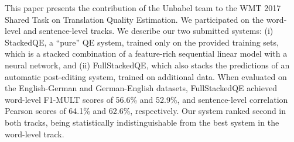 This paper presents the contribution of the Unbabel team to the WMT 2017 Shared Task on Translation Quality Estimation. We participated on the word-level and sentence-level tracks. We describe our two submitted systems: (i) StackedQE, a ``pure'' QE system, trained only on the provided training sets, which is a stacked combination of a feature-rich sequential linear model with a neural network, and (ii) FullStackedQE, which also stacks the predictions of an automatic post-editing system, trained on additional data. When evaluated on the English-German and German-English datasets, FullStackedQE achieved word-level F1-MULT scores of 56.6\% and 52.9\%, and sentence-level correlation Pearson scores of 64.1\% and 62.6\%, respectively. Our system ranked second in both tracks, being statistically indistinguishable from the best system in the word-level track.
